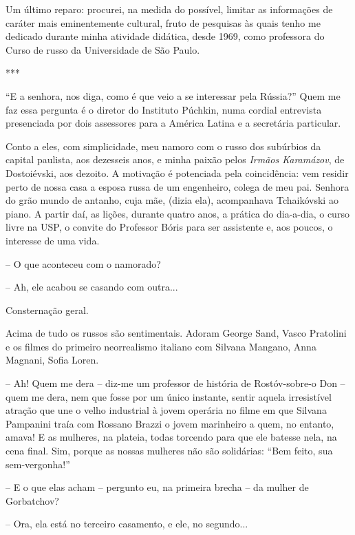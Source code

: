 Um último reparo: procurei, na medida do possível, limitar as
informações de caráter mais eminentemente cultural, fruto de pesquisas
às quais tenho me dedicado durante minha atividade didática, desde 1969,
como professora do Curso de russo da Universidade de São Paulo.

***

``E a senhora, nos diga, como é que veio a se interessar pela Rússia?''
Quem me faz essa pergunta é o diretor do Instituto Púchkin, numa cordial
entrevista presenciada por dois assessores para a América Latina e a
secretária particular.

Conto a eles, com simplicidade, meu namoro com o russo dos subúrbios da
capital paulista, aos dezesseis anos, e minha paixão pelos \emph{Irmãos
Karamázov}, de Dostoiévski, aos dezoito. A motivação é potenciada pela
coincidência: vem residir perto de nossa casa a esposa russa de um
engenheiro, colega de meu pai. Senhora do grão mundo de antanho, cuja
mãe, (dizia ela), acompanhava Tchaikóvski ao piano. A partir daí, as
lições, durante quatro anos, a prática do dia-a-dia, o curso livre na
USP, o convite do Professor Bóris para ser assistente e, aos poucos, o
interesse de uma vida.

-- O que aconteceu com o namorado?

-- Ah, ele acabou se casando com outra...

Consternação geral.

Acima de tudo os russos são sentimentais. Adoram George Sand, Vasco
Pratolini e os filmes do primeiro neorrealismo italiano com Silvana
Mangano, Anna Magnani, Sofia Loren.

-- Ah! Quem me dera -- diz-me um professor de história de Rostóv-sobre-o
Don -- quem me dera, nem que fosse por um único instante, sentir aquela
irresistível atração que une o velho industrial à jovem operária no
filme em que Silvana Pampanini traía com Rossano Brazzi o jovem
marinheiro a quem, no entanto, amava! E as mulheres, na plateia, todas
torcendo para que ele batesse nela, na cena final. Sim, porque as nossas
mulheres não são solidárias: ``Bem feito, sua sem-vergonha!''

-- E o que elas acham -- pergunto eu, na primeira brecha -- da mulher de
Gorbatchov?

-- Ora, ela está no terceiro casamento, e ele, no segundo...


